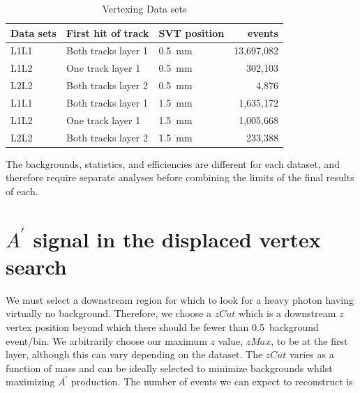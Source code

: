 \begin{table}[htb]
\caption{Vertexing Data sets}
\label{tab:datasets}
\centering
\begin{tabular}{lllr}
\toprule
Data sets &First hit of track & SVT position & events \\
\midrule
L1L1 & Both tracks layer 1 & 0.5~mm & 13,697,082\\
L1L2 & One track layer 1 & 0.5~mm & 302,103\\
L2L2 & Both tracks layer 2 & 0.5~mm & 4,876\\
L1L1 & Both tracks layer 1 & 1.5~mm & 1,635,172\\
L1L2 & One track layer 1 & 1.5~mm & 1,005,668\\
L2L2 & Both tracks layer 2 & 1.5~mm & 233,388\\
\bottomrule
\end{tabular}
\end{table}
The backgrounds, statistics, and efficiencies are different for each dataset, and therefore require separate analyses before combining the limits of the final results of each.

\section{$A^{\prime}$ signal in the displaced vertex search}
We must select a downstream region for which to look for a heavy photon having virtually no background. Therefore, we choose a $zCut$ which is a downstream $z$ vertex position beyond which there should be fewer than 0.5~background event/bin. We arbitrarily choose our maximum $z$ value, $zMax$, to be at the first layer, although this can vary depending on the dataset. The $zCut$ varies as a function of mass and can be ideally selected to minimize backgrounds whilst maximizing $A^{\prime}$ production. The number of events we can expect to reconstruct is 

